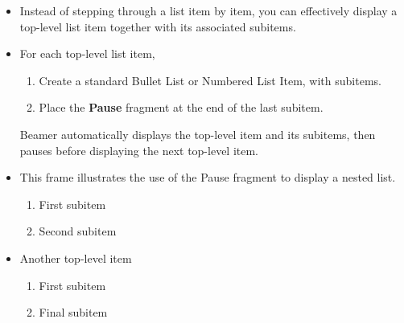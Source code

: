 \documentclass[notes=show,beamer]{beamer}
\begin{document}
\begin{frame}%



\begin{itemize}
\item Instead of stepping through a list item by item, you can effectively
display a top-level list item together with its associated subitems.%
\pause%

\item For each top-level list item,

\begin{enumerate}
\item Create a standard Bullet List or Numbered List Item, with subitems.

\item Place the \textbf{Pause} fragment at the end of the last subitem.
\end{enumerate}

Beamer automatically displays the top-level item and its subitems, then
pauses before displaying the next top-level item.%
\pause%

\item This frame illustrates the use of the Pause fragment to display a
nested list.

\begin{enumerate}
\item First subitem

\item Second subitem%
\pause%
\end{enumerate}

\item Another top-level item

\begin{enumerate}
\item First subitem

\item Final subitem
\end{enumerate}
\end{itemize}

\transboxout%
\end{frame}%
\end{document}
